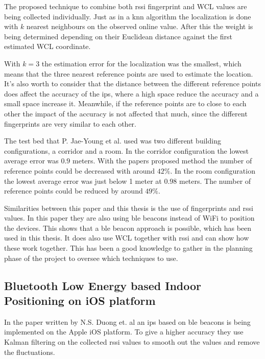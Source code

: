 \bigskip

The proposed technique to combine both \acrshort{rssi} fingerprint and WCL values are being collected individually.
Just as in a \acrshort{knn} algorithm the localization is done with $k$ nearest neighbours on the observed online value.
After this the weight is being determined depending on their Euclidean distance against the first estimated WCL coordinate.

\bigskip

With $k=3$ the estimation error for the localization was the smallest, which means that the three nearest reference points are used to estimate the location.
It's also worth to consider that the distance between the different reference points does affect the accuracy of the \acrshort{ips}, where a high space reduce the accuracy and a small space increase it.
Meanwhile, if the reference points are to close to each other the impact of the accuracy is not affected that much, since the different fingerprints are very similar to each other.

\bigskip

The test bed that P. Jae-Young et al. used was two different building configurations, a corridor and a room.
In the corridor configuration the lowest average error was $0.9$ meters. 
With the papers proposed method the number of reference points could be decreased with around $42\%$.
In the room configuration the lowest average error was just below 1 meter at $0.98$ meters.
The number of reference points could be reduced by around $49\%$.

\bigskip

Similarities between this paper and this thesis is the use of fingerprints and \acrshort{rssi} values.
In this paper they are also using \acrshort{ble} beacons instead of WiFi to position the devices.
This shows that a \acrshort{ble} beacon approach is possible, which has been used in this thesis.
It does also use WCL together with \acrshort{rssi} and can show how these work together.
This has been a good knowledge to gather in the planning phase of the project to oversee which techniques to use.


\subsection{Bluetooth Low Energy based Indoor Positioning on iOS platform}\label{sec:}
In the paper \cite{BluetoothLowEnergy2018} written by N.S. Duong et. al an \acrshort{ips} based on \acrshort{ble} beacons is being implemented on the Apple iOS platform.
To give a higher accuracy they use Kalman filtering on the collected \acrshort{rssi} values to smooth out the values and remove the fluctuations.

